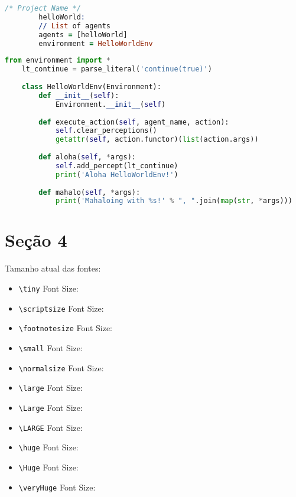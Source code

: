 \documentclass[a0,portrait]{lab-poster}
\begin{document}
\begin{multicols}{2}
\begin{minipage}{.235\textwidth}
	\begin{minipage}{\textwidth}
		\lstset{style=codeStyle}
		\begin{lstlisting}[language=Prolog, label={alg:exemplo-projeto-hello-world}, caption={Exemplo de projeto do AgentSpeak(Py).}]
		/* Project Name */
		helloWorld:
		// List of agents
		agents = [helloWorld]
		environment = HelloWorldEnv
		\end{lstlisting}
	\end{minipage}\hfill
\end{minipage}\hfill
\begin{minipage}{.235\textwidth}
	\lstset{style=codeStyle}
	\begin{lstlisting}[language=Python, label={alg:exemplo-environment}, caption={Exemplo da descrição do ambiente em Python.}]
	from environment import *
	lt_continue = parse_literal('continue(true)')
	
	class HelloWorldEnv(Environment):
		def __init__(self):
			Environment.__init__(self)
		
		def execute_action(self, agent_name, action):
			self.clear_perceptions()
			getattr(self, action.functor)(list(action.args))
		
		def aloha(self, *args):
			self.add_percept(lt_continue)
			print('Aloha HelloWorldEnv!')
		
		def mahalo(self, *args):
			print('Mahaloing with %s!' % ", ".join(map(str, *args)))
	\end{lstlisting}
\end{minipage}

\section*{\huge Seção 4}
      
Tamanho atual das fontes:
\begin{itemize}
	\item {\tiny \verb|\tiny| Font Size: \showfontsize}
	\item {\scriptsize \verb|\scriptsize| Font Size: \showfontsize}
	\item {\footnotesize \verb|\footnotesize| Font Size: \showfontsize}
	\item {\small \verb|\small| Font Size: \showfontsize}
	\item {\normalsize \verb|\normalsize| Font Size: \showfontsize}
	\item {\large \verb|\large| Font Size: \showfontsize}
	\item {\Large \verb|\Large| Font Size: \showfontsize}
	\item {\LARGE \verb|\LARGE| Font Size: \showfontsize}
	\item {\huge \verb|\huge| Font Size: \showfontsize}
	\item {\Huge \verb|\Huge| Font Size: \showfontsize}
	\item {\veryHuge \verb|\veryHuge| Font Size: \showfontsize}
\end{itemize}



\end{multicols}
\end{document}
